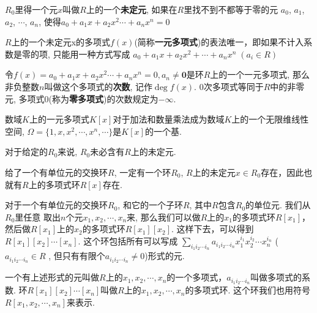 \begin{Definition}[未定元]
$R_0$里得一个元$x$叫做$R$上的一个\textbf{未定元}, 如果在$R$里找不到不都等于零的元
$a_0$, $a_1$, $a_2$, $\cdots$, $a_n$, 使得$a_0 + a_1 x + a_2 x^2 \cdots + a_n x^n = 0$
\end{Definition}

\begin{Proposition}[!]
$R$上的一个未定元x的多项式$f(x)$(简称\textbf{一元多项式})的表法唯一，即如果不计入系数是零的项, 只能用一种方式写成
$a_0 + a_1 x + a_2 x^2 + \cdots + a_n x^n \; (a_i \in R)$
\end{Proposition}

\begin{Definition}[多项式的次数]
令$f(x) = a_0 + a_1 x + a_2 x^2 \cdots + a_n x^n = 0, a_n \neq \mathbf{0}$是环$R$上的一个一元多项式,
那么非负整数$n$叫做这个多项式的\textbf{次数}, 记作$\deg f(x)$. $0$次多项式等同于$R$中的非零元, 多项式$0$(称为\textbf{零多项式})的次数规定为$-\infty$.
\end{Definition}

\begin{Note}
数域$K$上的一元多项式$K[x]$对于加法和数量乘法成为数域$K$上的一个无限维线性空间, 
$\Omega = \{ 1, x, x^2, \cdots, x^n, \cdots \}$是$K[x]$的一个基.
\end{Note}

\begin{Proposition}
对于给定的$R_0$来说, $R_0$未必含有$R$上的未定元.
\end{Proposition}

\begin{Theorem}
给了一个有单位元的交换环$R$, 一定有一个环$R_0$, $R$上的未定元$x \in R_0$存在，因此也就有$R$上的多项式环$R[x]$存在.
\end{Theorem}

\begin{Note}
对于一个有单位元的交换环$R_0$, 和它的一个子环$R$, 其中$R$包含$R_0$的单位元. 我们从$R_0$里任意
取出$n$个元$x_1, x_2, \cdots, x_n$来, 那么我们可以做$R$上的$x_1$的多项式环$R[x_1]$，然后做$R[x_1]$上的$x_2$的多项式环$R[x_1][x_2]$. 这样下去，可以得到$R[x_1][x_2]\cdots[x_n]$. 这个环包括所有可以写成 
$\displaystyle \sum_{i_1 i_2 \cdots i_n} a_{i_1 i_2 \cdots i_n} x_1^{i_1} x_2^{i_2} \cdots x_n^{i_n}$ ($a_{i_1 i_2 \cdots i_n} \in R$
, 但只有有限个$a_{i_1 i_2 \cdots i_n} \neq 0$)形式的元.
\end{Note}

\begin{Definition}
一个有上述形式的元叫做$R$上的$x_1, x_2, \cdots, x_n$的一个多项式，$a_{i_1 i_2 \cdots i_n}$叫做多项式的系数. 环$R[x_1][x_2]\cdots[x_n]$叫做$R$上的$x_1, x_2, \cdots, x_n$的多项式环. 这个环我们也用符号$R[x_1, x_2, \cdots, x_n]$来表示.
\end{Definition}

